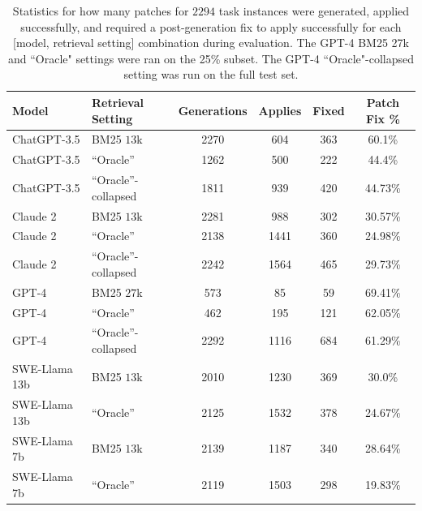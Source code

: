 \begin{table}[ht]
\centering
\begin{tabular}{llcccc}
\toprule
    Model & Retrieval Setting & Generations & Applies & Fixed & Patch Fix \% \\
\midrule
    ChatGPT-3.5   & BM25 $13$k            & \num{2270} & \num{604} & \num{363} & \num{60.1}\%  \\
    ChatGPT-3.5   & ``Oracle''            & \num{1262} & \num{500} & \num{222} & \num{44.4}\%  \\
    ChatGPT-3.5   & ``Oracle''-collapsed  & \num{1811} & \num{939} & \num{420} & \num{44.73}\%  \\
    Claude 2      & BM25 $13$k            & \num{2281} & \num{988} & \num{302} & \num{30.57}\%  \\
    Claude 2      & ``Oracle''            & \num{2138} & \num{1441} & \num{360} & \num{24.98}\%  \\
    Claude 2      & ``Oracle''-collapsed  & \num{2242} & \num{1564} & \num{465} & \num{29.73}\%  \\
    GPT-4         & BM25 $27$k            & \num{573} & \num{85} & \num{59} & \num{69.41}\%  \\
    GPT-4         & ``Oracle''            & \num{462} & \num{195} & \num{121} & \num{62.05}\%  \\
    GPT-4         & ``Oracle''-collapsed  & \num{2292} & \num{1116} & \num{684} & \num{61.29}\%  \\
    SWE-Llama 13b & BM25 $13$k            & \num{2010} & \num{1230} & \num{369} & \num{30.0}\%  \\
    SWE-Llama 13b & ``Oracle''            & \num{2125} & \num{1532} & \num{378} & \num{24.67}\%  \\
    SWE-Llama 7b  & BM25 $13$k            & \num{2139} & \num{1187} & \num{340} & \num{28.64}\%  \\
    SWE-Llama 7b & ``Oracle''             & \num{2119} & \num{1503} & \num{298} & \num{19.83}\%  \\
\bottomrule
\end{tabular}
\caption{Statistics for how many patches for $\num{2294}$ task instances were generated, applied successfully, and required a post-generation fix to apply successfully for each [model, retrieval setting] combination during evaluation. The GPT-4 BM25 27k and ``Oracle" settings were ran on the 25\% subset. The GPT-4 ``Oracle"-collapsed setting was run on the full \benchmark{} test set.}
\label{table:patch-fix-rates}
\end{table}